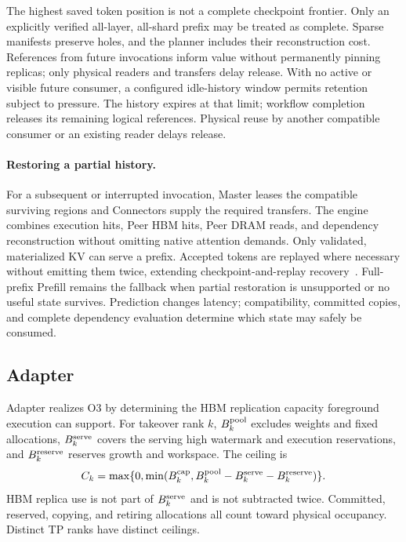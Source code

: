 The highest saved token position is not a complete checkpoint frontier.
Only an explicitly verified all-layer, all-shard prefix may be treated
as complete. Sparse manifests preserve holes, and the planner includes
their reconstruction cost. References from future invocations inform
value without permanently pinning replicas; only physical readers and transfers delay release.
With no active or visible future consumer, a configured idle-history
window permits retention subject to pressure. The history expires
at that limit; workflow completion releases its remaining logical references. Physical reuse
by another compatible consumer or an existing reader delays release.

\paragraph{Restoring a partial history.}
For a subsequent or interrupted invocation, Master leases the compatible
surviving regions and Connectors supply the required transfers. The
engine combines execution hits, Peer HBM hits, Peer DRAM reads, and
dependency reconstruction without omitting native attention demands.
Only validated, materialized KV can serve a prefix. Accepted tokens
are replayed where necessary without emitting them twice, extending
checkpoint-and-replay recovery~\cite{strati2024dejavu,cao2026lumen}.
Full-prefix Prefill remains the fallback when partial restoration is
unsupported or no useful state survives. Prediction changes latency;
compatibility, committed copies, and complete dependency evaluation
determine which state may safely be consumed.

\subsection{Adapter}
\label{sec:capacity}

Adapter realizes O3 by determining the HBM replication capacity
foreground execution can support. For takeover rank $k$,
$B^{\rm pool}_k$ excludes weights and fixed allocations,
$B^{\rm serve}_k$ covers the serving high watermark and execution
reservations, and $B^{\rm reserve}_k$ reserves growth and workspace.
The ceiling is
\begin{equation}
 C_k=\max\{0,\min(B^{\rm cap}_k,
 B^{\rm pool}_k-B^{\rm serve}_k-B^{\rm reserve}_k)\}.
 \label{eq:ceiling}
\end{equation}
HBM replica use is not part of $B^{\rm serve}_k$ and is not subtracted twice.
Committed, reserved, copying, and retiring allocations all count toward
physical occupancy. Distinct TP ranks have distinct ceilings.

